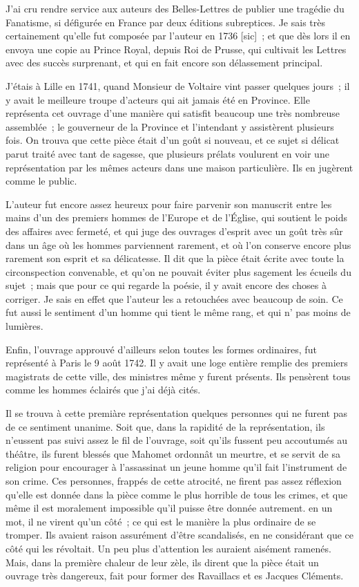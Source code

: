 \documentclass[french,twoside]{book} %
\begin{document}
\noindent J’ai cru rendre service aux auteurs des Belles-Lettres de publier une tragédie du Fanatisme, si défigurée en France par deux éditions subreptices. Je sais très certainement qu’elle fut composée par l’auteur en 1736 [sic] ; et que dès lors il en envoya une copie au Prince Royal, depuis Roi de Prusse, qui cultivait les Lettres avec des succès surprenant, et qui en fait encore son délassement principal.\par
J’étais à Lille en 1741, quand Monsieur de Voltaire vint passer quelques jours ; il y avait le meilleure troupe d’acteurs qui ait jamais été en Province. Elle représenta cet ouvrage d’une manière qui satisfit beaucoup une très nombreuse assemblée ; le gouverneur de la Province et l’intendant y assistèrent plusieurs fois. On trouva que cette pièce était d’un goût si nouveau, et ce sujet si délicat parut traité avec tant de sagesse, que plusieurs prélats voulurent en voir une représentation par les mêmes acteurs dans une maison particulière. Ils en jugèrent comme le public.\par
L’auteur fut encore assez heureux pour faire parvenir son manuscrit entre les mains d’un des premiers hommes de l’Europe et de l’Église, qui soutient le poids des affaires avec fermeté, et qui juge des ouvrages d’esprit avec un goût très sûr dans un âge où les hommes parviennent rarement, et où l’on conserve encore plus rarement son esprit et sa délicatesse. Il dit que la pièce était écrite avec toute la circonspection convenable, et qu’on ne pouvait éviter plus sagement les écueils du sujet ; mais que pour ce qui regarde la poésie, il y avait encore des choses à corriger. Je sais en effet que l’auteur les a retouchées avec beaucoup de soin. Ce fut aussi le sentiment d’un homme qui tient le même rang, et qui n’ pas moins de lumières.\par
Enfin, l’ouvrage approuvé d’ailleurs selon toutes les formes ordinaires, fut représenté à Paris le 9 août 1742. Il y avait une loge entière remplie des premiers magistrats de cette ville, des ministres même y furent présents. Ils pensèrent tous comme les hommes éclairés que j’ai déjà cités.\par
Il se trouva à cette premiàre représentation quelques personnes qui ne furent pas de ce sentiment unanime. Soit que, dans la rapidité de la représentation, ils n’eussent pas suivi assez le fil de l’ouvrage, soit qu’ils fussent peu accoutumés au théâtre, ils furent blessés que Mahomet ordonnât un meurtre, et se servit de sa religion pour encourager à l’assassinat un jeune homme qu’il fait l’instrument de son crime. Ces personnes, frappés de cette atrocité, ne firent pas assez réflexion qu’elle est donnée dans la pièce comme le plus horrible de tous les crimes, et que même il est moralement impossible qu’il puisse être donnée autrement. en un mot, il ne virent qu’un côté ; ce qui est le manière la plus ordinaire de se tromper. Ils avaient raison assurément d’être scandalisés, en ne considérant que ce côté qui les révoltait. Un peu plus d’attention les auraient aisément ramenés. Mais, dans la première chaleur de leur zèle, ils dirent que la pièce était un ouvrage très dangereux, fait pour former des Ravaillacs et es Jacques Cléments.\par
\end{document}

